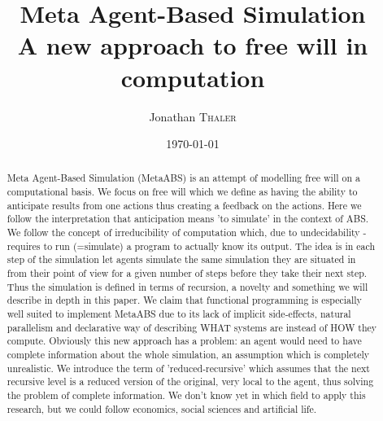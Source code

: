 \documentclass{article}
\title{Meta Agent-Based Simulation \\ A new approach to free will in computation} %
\author{Jonathan \textsc{Thaler}} %
\date{\today} %
\begin{document}
\maketitle %

\begin{abstract}
Meta Agent-Based Simulation (MetaABS) is an attempt of modelling free will on a computational basis. We focus on free will which we define as having the ability to anticipate results from one actions thus creating a feedback on the actions. Here we follow the interpretation that anticipation means 'to simulate' in the context of ABS. We follow the concept of irreducibility of computation which, due to undecidability - requires to run (=simulate) a program to actually know its output. The idea is in each step of the simulation let agents simulate the same simulation they are situated in from their point of view for a given number of steps before they take their next step. Thus the simulation is defined in terms of recursion, a novelty and something we will describe in depth in this paper. We claim that functional programming is especially well suited to implement MetaABS due to its lack of implicit side-effects, natural parallelism and declarative way of describing WHAT systems are instead of HOW they compute. Obviously this new approach has a problem: an agent would need to have complete information about the whole simulation, an assumption which is completely unrealistic. We introduce the term of 'reduced-recursive' which assumes that the next recursive level is a reduced version of the original, very local to the agent, thus solving the problem of complete information.
We don't know yet in which field to apply this research, but we could follow economics, social sciences and artificial life.
\end{abstract}




\end{document}
